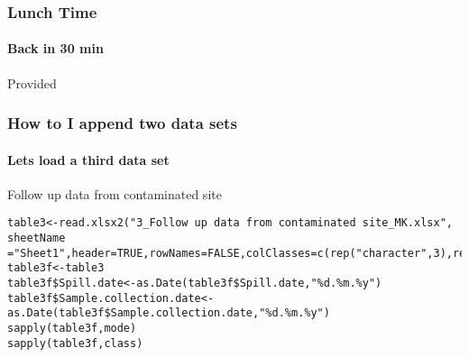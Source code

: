 \documentclass[12pt]{beamer}\usepackage[]{graphicx}\usepackage[]{color}
\begin{document}
\begin{frame}
  \frametitle{Lunch Time}
  \framesubtitle{Back in 30 min}
  Provided
\end{frame}

\begin{frame}[fragile]
  \frametitle{How to I append two data sets}
  \framesubtitle{Lets load a third data set}
  \begin{block}{Follow up data from contaminated site}

  \end{block}
\begin{lstlisting} 
table3<-read.xlsx2("3_Follow up data from contaminated site_MK.xlsx", sheetName ="Sheet1",header=TRUE,rowNames=FALSE,colClasses=c(rep("character",3),rep("character",2),rep("numeric",18)))
table3f<-table3
table3f$Spill.date<-as.Date(table3f$Spill.date,"%d.%m.%y")
table3f$Sample.collection.date<-as.Date(table3f$Sample.collection.date,"%d.%m.%y")
sapply(table3f,mode)
sapply(table3f,class)
\end{lstlisting}
  

\end{frame}
\end{document}
